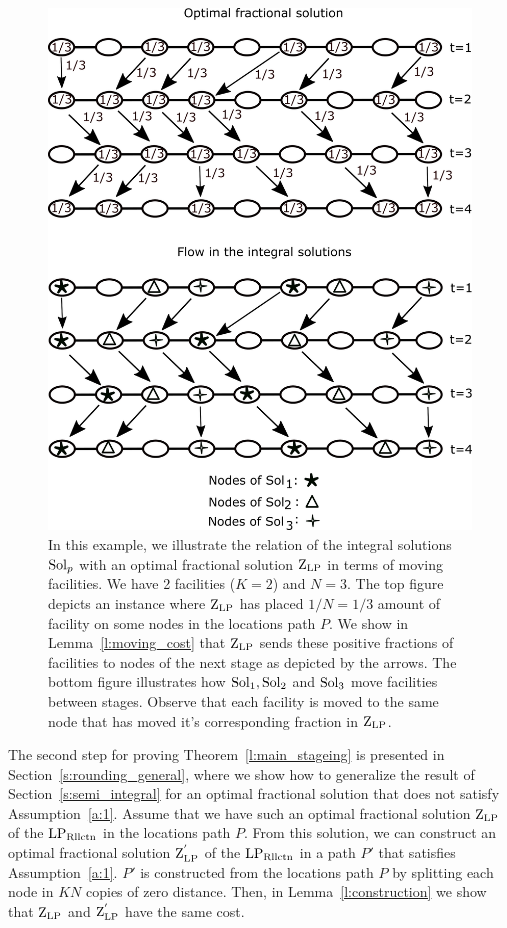 \begin{figure}
    \centering
    \includegraphics[scale=0.14]{moving_cost.png}
    \caption{In this example, we illustrate the relation of the integral solutions $\mathrm{Sol}_p$ with an optimal fractional solution $\mathrm{Z}_{\mathrm{LP}}$ in terms of moving facilities. We have 2 facilities ($K=2$) and $N=3$. The top figure depicts an instance where $\mathrm{Z}_{\mathrm{LP}}$ has placed $1/N=1/3$ amount of facility on some nodes in the locations path $P$. We show in Lemma~\ref{l:moving_cost} that $\mathrm{Z}_{\mathrm{LP}}$ sends these positive fractions of facilities to nodes of the next stage as depicted by the arrows. The bottom figure illustrates how $\mathrm{Sol}_1, \mathrm{Sol}_2$ and $\mathrm{Sol}_3$ move facilities between stages. Observe that each facility is moved to the same node that has moved it's corresponding fraction in $\mathrm{Z}_{\mathrm{LP}}$.}
    \label{fig:movingcost}
\end{figure}



The second step for proving Theorem~\ref{l:main_stageing} is presented in Section~\ref{s:rounding_general}, where we show how to generalize the result of Section~\ref{s:semi_integral} for an optimal fractional solution that does not satisfy Assumption~\ref{a:1}. Assume that we have such an optimal fractional solution $\mathrm{Z}_{\mathrm{LP}}$ of the $\mathrm{LP_{\mathrm{Rllctn}}}$ in the locations path $P$. From this solution, we can construct an optimal fractional solution $\mathrm{Z}_{\mathrm{LP}}^{'}$ of the $\mathrm{LP_{\mathrm{Rllctn}}}$ in a path $P'$ that satisfies Assumption~\ref{a:1}. $P'$ is constructed from the locations path $P$ by splitting each node in $KN$ copies of zero distance. Then, in Lemma~\ref{l:construction} we show that $\mathrm{Z}_{\mathrm{LP}}$ and $\mathrm{Z}_{\mathrm{LP}}^{'}$ have the same cost. 

